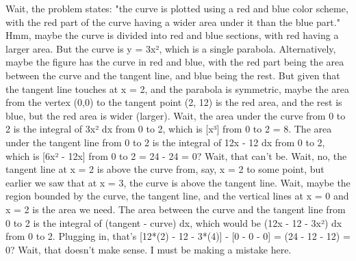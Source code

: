 Wait, the problem states: "the curve is plotted using a red and blue color scheme, with the red part of the curve having a wider area under it than the blue part." Hmm, maybe the curve is divided into red and blue sections, with red having a larger area. But the curve is y = 3x², which is a single parabola. Alternatively, maybe the figure has the curve in red and blue, with the red part being the area between the curve and the tangent line, and blue being the rest. But given that the tangent line touches at x = 2, and the parabola is symmetric, maybe the area from the vertex (0,0) to the tangent point (2, 12) is the red area, and the rest is blue, but the red area is wider (larger). Wait, the area under the curve from 0 to 2 is the integral of 3x² dx from 0 to 2, which is [x³] from 0 to 2 = 8. The area under the tangent line from 0 to 2 is the integral of 12x - 12 dx from 0 to 2, which is [6x² - 12x] from 0 to 2 = 24 - 24 = 0? Wait, that can't be. Wait, no, the tangent line at x = 2 is above the curve from, say, x = 2 to some point, but earlier we saw that at x = 3, the curve is above the tangent line. Wait, maybe the region bounded by the curve, the tangent line, and the vertical lines at x = 0 and x = 2 is the area we need. The area between the curve and the tangent line from 0 to 2 is the integral of (tangent - curve) dx, which would be (12x - 12 - 3x²) dx from 0 to 2. Plugging in, that's [12*(2) - 12 - 3*(4)] - [0 - 0 - 0] = (24 - 12 - 12) = 0? Wait, that doesn't make sense. I must be making a mistake here.

